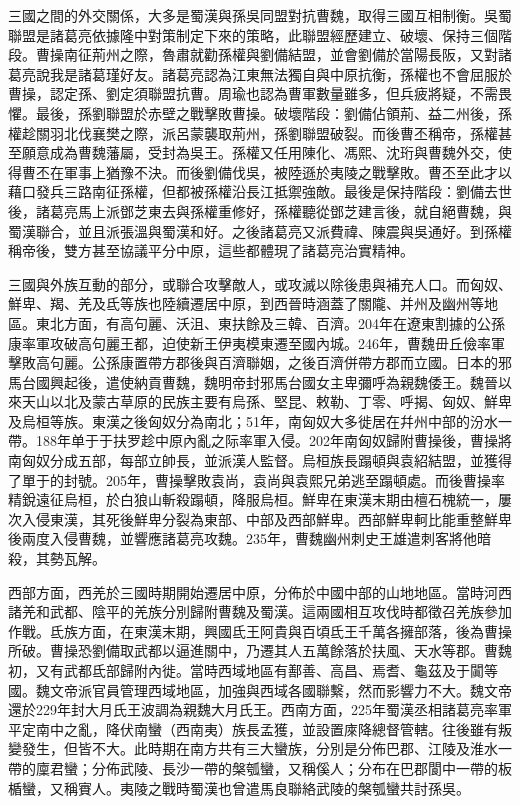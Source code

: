 三國之間的外交關係，大多是蜀漢與孫吳同盟對抗曹魏，取得三國互相制衡。吳蜀聯盟是諸葛亮依據隆中對策制定下來的策略，此聯盟經歷建立、破壞、保持三個階段。曹操南征荊州之際，魯肅就勸孫權與劉備結盟，並會劉備於當陽長阪，又對諸葛亮說我是諸葛瑾好友。諸葛亮認為江東無法獨自與中原抗衡，孫權也不會屈服於曹操，認定孫、劉定須聯盟抗曹。周瑜也認為曹軍數量雖多，但兵疲將疑，不需畏懼。最後，孫劉聯盟於赤壁之戰擊敗曹操。破壞階段：劉備佔領荊、益二州後，孫權趁關羽北伐襄樊之際，派呂蒙襲取荊州，孫劉聯盟破裂。而後曹丕稱帝，孫權甚至願意成為曹魏藩屬，受封為吳王。孫權又任用陳化、馮熙、沈珩與曹魏外交，使得曹丕在軍事上猶豫不決。而後劉備伐吳，被陸遜於夷陵之戰擊敗。曹丕至此才以藉口發兵三路南征孫權，但都被孫權沿長江抵禦強敵。最後是保持階段：劉備去世後，諸葛亮馬上派鄧芝東去與孫權重修好，孫權聽從鄧芝建言後，就自絕曹魏，與蜀漢聯合，並且派張溫與蜀漢和好。之後諸葛亮又派費禕、陳震與吳通好。到孫權稱帝後，雙方甚至協議平分中原，這些都體現了諸葛亮治實精神。

三國與外族互動的部分，或聯合攻擊敵人，或攻滅以除後患與補充人口。而匈奴、鮮卑、羯、羌及氐等族也陸續遷居中原，到西晉時涵蓋了關隴、并州及幽州等地區。東北方面，有高句麗、沃沮、東扶餘及三韓、百濟。204年在遼東割據的公孫康率軍攻破高句麗王都，迫使新王伊夷模東遷至國內城。246年，曹魏毌丘儉率軍擊敗高句麗。公孫康置帶方郡後與百濟聯姻，之後百濟併帶方郡而立國。日本的邪馬台國興起後，遣使納貢曹魏，魏明帝封邪馬台國女主卑彌呼為親魏倭王。魏晉以來天山以北及蒙古草原的民族主要有烏孫、堅昆、敕勒、丁零、呼揭、匈奴、鮮卑及烏桓等族。東漢之後匈奴分為南北；51年，南匈奴大多徙居在幷州中部的汾水一帶。188年单于于扶罗趁中原內亂之际率軍入侵。202年南匈奴歸附曹操後，曹操將南匈奴分成五部，每部立帥長，並派漢人監督。烏桓族長蹋頓與袁紹結盟，並獲得了單于的封號。205年，曹操擊敗袁尚，袁尚與袁熙兄弟逃至蹋頓處。而後曹操率精銳遠征烏桓，於白狼山斬殺蹋頓，降服烏桓。鮮卑在東漢末期由檀石槐統一，屢次入侵東漢，其死後鮮卑分裂為東部、中部及西部鮮卑。西部鮮卑軻比能重整鮮卑後兩度入侵曹魏，並響應諸葛亮攻魏。235年，曹魏幽州刺史王雄遣刺客將他暗殺，其勢瓦解。

西部方面，西羌於三國時期開始遷居中原，分佈於中國中部的山地地區。當時河西諸羌和武都、陰平的羌族分別歸附曹魏及蜀漢。這兩國相互攻伐時都徵召羌族參加作戰。氐族方面，在東漢末期，興國氐王阿貴與百頃氐王千萬各擁部落，後為曹操所破。曹操恐劉備取武都以逼進關中，乃遷其人五萬餘落於扶風、天水等郡。曹魏初，又有武都氐部歸附內徙。當時西域地區有鄯善、高昌、焉耆、龜茲及于闐等國。魏文帝派官員管理西域地區，加強與西域各國聯繫，然而影響力不大。魏文帝還於229年封大月氏王波調為親魏大月氏王。西南方面，225年蜀漢丞相諸葛亮率軍平定南中之亂，降伏南蠻（西南夷）族長孟獲，並設置庲降總督管轄。往後雖有叛變發生，但皆不大。此時期在南方共有三大蠻族，分別是分佈巴郡、江陵及淮水一帶的廩君蠻；分佈武陵、長沙一帶的槃瓠蠻，又稱傒人；分布在巴郡閬中一帶的板楯蠻，又稱賨人。夷陵之戰時蜀漢也曾遣馬良聯絡武陵的槃瓠蠻共討孫吳。

